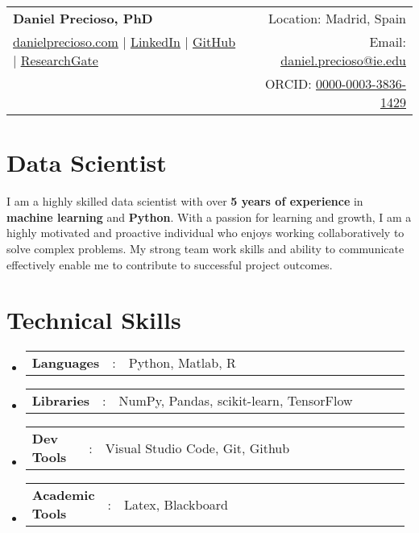 \documentclass[a4paper,11pt]{article}
\newcommand{\resumeSectionType}[3]{
	\item\begin{tabular*}{0.96\textwidth}[t]{
			p{0.15\linewidth}p{0.02\linewidth}p{0.81\linewidth}
		}
		\textbf{#1} & #2 & #3
	\end{tabular*}\vspace{-2pt}
}
\newcommand{\resumeHeadingListStart}{
	\begin{itemize}[leftmargin=0.15in, label={}]
	}
\newcommand{\resumeHeadingListEnd}{\end{itemize}}
\begin{document}
	
	
	\begin{tabular*}{\textwidth}{l@{\extracolsep{\fill}}r}
		\textbf{\Huge Daniel Precioso, PhD \vspace{2pt}} & %
		Location: Madrid, Spain \\ %
		\href{https://danielprecioso.com}{\uline{danielprecioso.com}} $|$ %
		\href{https://www.linkedin.com/in/daniel-precioso-garcelan}{\uline{LinkedIn}} $|$ %
		\href{https://github.com/daniprec}{\uline{GitHub}} %
		$|$ \href{https://www.researchgate.net/profile/Daniel-Precioso-Garcelan}{\uline{ResearchGate}} %
		& %
		Email: \href{mailto:daniel.precioso@ie.edu}{\uline{daniel.precioso@ie.edu}} \\ %
		& %
		ORCID: \href{https://orcid.org/0000-0003-3836-1429}{\uline{0000-0003-3836-1429}} \\ %
	\end{tabular*}
	
	
	
	\section{Data Scientist}
		 I am a highly skilled data scientist with over \textbf{5 years of experience} in \textbf{machine learning} and \textbf{Python}. With a passion for learning and growth, I am a highly motivated and proactive individual who enjoys working collaboratively to solve complex problems. My strong team work skills and ability to communicate effectively enable me to contribute to successful project outcomes.
	
	
	
	\section{Technical Skills}
	\resumeHeadingListStart{}
	\resumeSectionType{Languages}{:}{Python, Matlab, R}
	\resumeSectionType{Libraries}{:}{NumPy, Pandas, scikit-learn, TensorFlow}
	\resumeSectionType{Dev Tools}{:}{Visual Studio Code, Git, Github}
	\resumeSectionType{Academic Tools}{:}{Latex, Blackboard}
	\resumeHeadingListEnd{}
	
\end{document}
